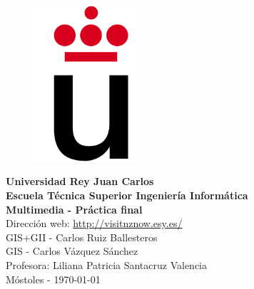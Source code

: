\setlength{\unitlength}{1 cm} %
\thispagestyle{empty}
\begin{figure}[htb]
\begin{center}
\includegraphics[width=4cm]{./Fotos/logoURJC}
\end{center}
\end{figure}
\begin{center}
\textbf{{\Huge Universidad Rey Juan Carlos}\\[0.5cm]
{\LARGE Escuela Técnica Superior Ingeniería Informática}}\\[1.25cm]

{\LARGE \textbf{Multimedia - Práctica final}}\\[1cm]
{\LARGE Dirección web: \href{http://visitnznow.esy.es/}{http://visitnznow.esy.es/}}\\[3cm]

{\large GIS+GII - Carlos Ruiz Ballesteros}\\[1cm]
{\large GIS - Carlos Vázquez Sánchez}\\[1cm]
{\large Profesora: Liliana Patricia Santacruz Valencia}\\[1cm]

Móstoles - \today
\end{center}